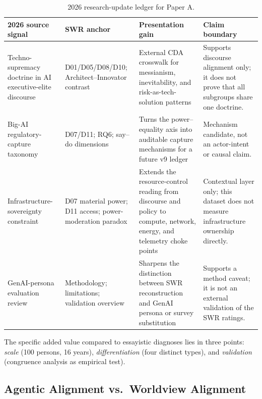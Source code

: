 \documentclass[12pt,a4paper]{article}
\begin{document}
\begin{table}[htbp]
  \centering
  \caption{2026 research-update ledger for Paper A.}
  \label{tab:research_update_ledger}
  \scriptsize
  \begin{tabularx}{\textwidth}{@{} L{3.0cm} L{2.8cm} L{3.4cm} Y @{}}
    \toprule
    \textbf{2026 source signal} & \textbf{SWR anchor} & \textbf{Presentation gain} & \textbf{Claim boundary} \\
    \midrule
    Techno-supremacy doctrine in AI executive-elite discourse~\citep{PerezUrbina2026TechnoSupremacy} & D01/D05/D08/D10; Architect--Innovator contrast & External CDA crosswalk for messianism, inevitability, and risk-as-tech-solution patterns & Supports discourse alignment only; it does not prove that all subgroups share one doctrine. \\[3pt]
    Big-AI regulatory-capture taxonomy~\citep{BirhaneEtAl2026RegulatoryCapture} & D07/D11; RQ6; say--do dimensions & Turns the power--equality axis into auditable capture mechanisms for a future v9 ledger & Mechanism candidate, not an actor-intent or causal claim. \\[3pt]
    Infrastructure-sovereignty constraint~\citep{Cruzes2026InfrastructureSovereignty} & D07 material power; D11 access; power-moderation paradox & Extends the resource-control reading from discourse and policy to compute, network, energy, and telemetry choke points & Contextual layer only; this dataset does not measure infrastructure ownership directly. \\[3pt]
    GenAI-persona evaluation review~\citep{AminEtAl2026GenAIPersonas} & Methodology; limitations; validation overview & Sharpens the distinction between SWR reconstruction and GenAI persona or survey substitution & Supports a method caveat; it is not an external validation of the SWR ratings. \\
    \bottomrule
  \end{tabularx}
\end{table}

The specific added value compared to essayistic diagnoses lies in three points: \emph{scale} (100 persons, 16 years), \emph{differentiation} (four distinct types), and \emph{validation} (congruence analysis as empirical test).


\subsection{\texorpdfstring{Agentic Alignment vs.\ Worldview Alignment}{Agentic Alignment vs. Worldview Alignment}}
\label{sec:diskussion:alignment}
\end{document}
